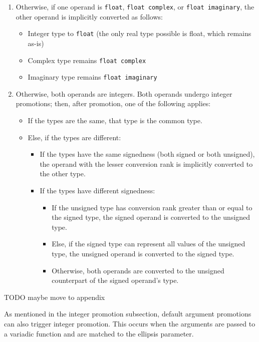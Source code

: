 \begin{enumerate}
    \item Otherwise, if one operand is \texttt{float}, \texttt{float complex}, or \texttt{float imaginary}, the other operand is implicitly converted as follows:
    \begin{itemize}
        \item Integer type to \texttt{float} (the only real type possible is float, which remains as-is)
        \item Complex type remains \texttt{float complex}
        \item Imaginary type remains \texttt{float imaginary}
    \end{itemize}

    \item Otherwise, both operands are integers. Both operands undergo integer promotions; then, after promotion, one of the following applies:
    \begin{itemize}
        \item If the types are the same, that type is the common type.
        \item Else, if the types are different:
        \begin{itemize}
            \item If the types have the same signedness (both signed or both unsigned), the operand with the lesser conversion rank is implicitly converted to the other type.
            \item If the types have different signedness:
            \begin{itemize}
                \item If the unsigned type has conversion rank greater than or equal to the signed type, the signed operand is converted to the unsigned type.
                \item Else, if the signed type can represent all values of the unsigned type, the unsigned operand is converted to the signed type.
                \item Otherwise, both operands are converted to the unsigned counterpart of the signed operand's type.
            \end{itemize}
        \end{itemize}
    \end{itemize}
\end{enumerate}
TODO maybe move to appendix

As mentioned in the integer promotion subsection, default argument promotions can also trigger integer promotion. This occurs when the arguments are passed to a variadic function and are matched to the ellipsis parameter.

